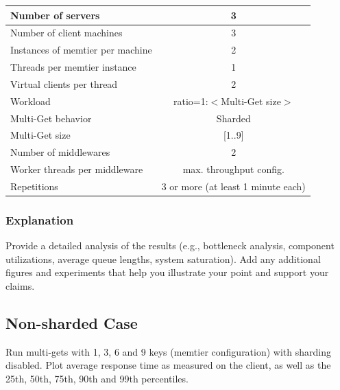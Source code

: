 \documentclass[11pt,a4paper]{article}
\begin{document}
\begin{center}
	\scriptsize{
		\begin{tabular}{|l|c|}
			\hline Number of servers                & 3                       \\ 
			\hline Number of client machines        & 3                       \\ 
			\hline Instances of memtier per machine & 2                       \\ 
			\hline Threads per memtier instance     & 1                       \\
			\hline Virtual clients per thread       & 2     		            \\ 
			\hline Workload                         & ratio=1:$<$Multi-Get size$>$             \\
			\hline Multi-Get behavior               & Sharded                 \\
			\hline Multi-Get size                   & [1..9]                  \\
			\hline Number of middlewares            & 2                       \\
			\hline Worker threads per middleware    & max. throughput config. \\
			\hline Repetitions                      & 3 or more (at least 1 minute each)               \\ 
			\hline 
		\end{tabular}
	} 
\end{center}

\subsubsection{Explanation}

Provide a detailed analysis of the results (e.g., bottleneck analysis, component utilizations, average queue lengths, system saturation). Add any additional figures and experiments that help you illustrate your point and support your claims.

\subsection{Non-sharded Case}

Run multi-gets with 1, 3, 6 and 9 keys (memtier configuration) with sharding disabled. Plot average response time as measured on the client, as well as the 25th, 50th, 75th, 90th and 99th percentiles.
\end{document}
